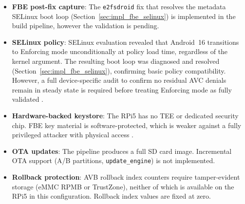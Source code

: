 \begin{itemize}
    \item \textbf{FBE post-fix capture}: The \texttt{e2fsdroid} fix that resolves the metadata SELinux boot loop (Section~\ref{sec:impl_fbe_selinux}) is implemented in the build pipeline, however the validation is pending.
    \item \textbf{SELinux policy}: SELinux evaluation revealed that Android~16 transitions to Enforcing mode unconditionally at policy load time, regardless of the  kernel argument. The resulting boot loop was diagnosed and resolved (Section~\ref{sec:impl_fbe_selinux}), confirming basic policy compatibility. However, a full device-specific audit to confirm no residual AVC denials remain in steady state is required before treating Enforcing mode as fully validated \cite{selinux_device_policy}.
    \item \textbf{Hardware-backed keystore}: The RPi5 has no TEE or dedicated security chip. FBE key material is software-protected, which is weaker against a fully privileged attacker with physical access \cite{android_data_encryption}.
    \item \textbf{OTA updates}: The pipeline produces a full SD card image. Incremental OTA support (A/B partitions, \texttt{update\_engine}) is not implemented.
    \item \textbf{Rollback protection}: AVB rollback index counters require tamper-evident storage (eMMC RPMB or TrustZone), neither of which is available on the RPi5 in this configuration. Rollback index values are fixed at zero.
\end{itemize}
